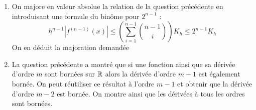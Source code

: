 \begin{enumerate}
\item On majore en valeur absolue la relation de la question précédente en introduisant une formule du binôme pour $2^{n-1}$ :
\begin{displaymath}
 h^{n-1}|f^{(n-1)}(x)|\leq
\left( \sum _{i=1}^{n-1}\binom{n-1}{i}\right) K_h \leq 2^{n-1}K_h
\end{displaymath}
On en déduit la majoration demandée
\item La question précédente a montré que si une fonction ainsi que sa dérivée d'ordre $m$ sont bornées sur $\mathbb{R}$ alors la dérivée d'ordre $m-1$ est également bornée. On peut réutiliser ce résultat à l'ordre $m-1$ et obtenir que la dérivée d'ordre $m-2$ est bornée. On montre ainsi que les dérivées à tous les ordres sont bornées.
\end{enumerate}
